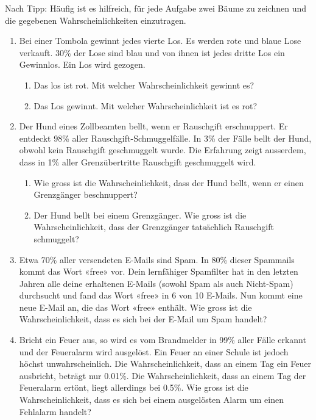 \begin{ueb}
  {Nach }{}
  Tipp: Häufig ist es hilfreich, für jede Aufgabe zwei Bäume zu zeichnen und die gegebenen Wahrscheinlichkeiten einzutragen.
  \begin{enumerate}
    \setcounter{enumi}{\value{tempCounter}}
    \item Bei einer Tombola gewinnt jedes vierte Los. Es werden rote und blaue Lose verkauft. 30\% der Lose sind blau und von ihnen ist jedes dritte Los ein Gewinnlos. Ein Los wird gezogen.
          \begin{enumerate}
            \item Das los ist rot. Mit welcher Wahrscheinlichkeit gewinnt es?
            \item Das Los gewinnt. Mit welcher Wahrscheinlichkeit ist es rot?
          \end{enumerate}




    \item Der Hund eines Zollbeamten bellt, wenn er Rauschgift erschnuppert. Er entdeckt 98\% aller Rauschgift-Schmuggelfälle. In 3\% der Fälle bellt der Hund, obwohl kein Rauschgift geschmuggelt wurde. Die Erfahrung zeigt ausserdem, dass in 1\% aller Grenzübertritte Rauschgift geschmuggelt wird.
          \begin{enumerate}
            \item Wie gross ist die Wahrscheinlichkeit, dass der Hund bellt, wenn er einen Grenzgänger beschnuppert?
            \item Der Hund bellt bei einem Grenzgänger. Wie gross ist die Wahrscheinlichkeit, dass der Grenzgänger tatsächlich Rauschgift schmuggelt?
          \end{enumerate}

    \item Etwa 70\% aller versendeten E-Mails sind Spam. In 80\% dieser Spammails kommt das Wort «free» vor. Dein lernfähiger Spamfilter hat in den letzten Jahren alle deine erhaltenen E-Mails (sowohl Spam als auch Nicht-Spam) durchsucht und fand das Wort «free» in 6 von 10 E-Mails. Nun kommt eine neue E-Mail an, die das Wort «free» enthält. Wie gross ist die Wahrscheinlichkeit, dass es sich bei der E-Mail um Spam handelt?

    \item  Bricht ein Feuer aus, so wird es vom Brandmelder in 99\% aller Fälle erkannt und der Feueralarm wird ausgelöst. Ein Feuer an einer Schule ist jedoch höchst unwahrscheinlich. Die Wahrscheinlichkeit, dass an einem Tag ein Feuer ausbricht, beträgt nur 0.01\%. Die Wahrscheinlichkeit, dass an einem Tag der Feueralarm ertönt, liegt allerdings bei 0.5\%. Wie gross ist die Wahrscheinlichkeit, dass es sich bei einem ausgelösten Alarm um einen Fehlalarm handelt?

  \end{enumerate}
\end{ueb}

